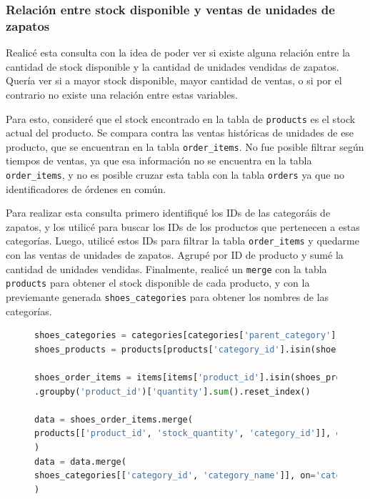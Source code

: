 \subsubsection{Relación entre stock disponible y ventas de unidades de zapatos}

Realicé esta consulta con la idea de poder ver si existe alguna relación entre la cantidad de stock disponible y la cantidad de unidades vendidas de zapatos. Quería ver si a mayor stock disponible, mayor cantidad de ventas, o si por el contrario no existe una relación entre estas variables.

Para esto, consideré que el stock encontrado en la tabla de \texttt{products} es el stock actual del producto. Se compara contra las ventas históricas de unidades de ese producto, que se encuentran en la tabla \texttt{order\_items}. No fue posible filtrar según tiempos de ventas, ya que esa información no se encuentra en la tabla \texttt{order\_items}, y no es posible cruzar esta tabla con la tabla \texttt{orders} ya que no identificadores de órdenes en común.

Para realizar esta consulta primero identifiqué los IDs de las categoráis de zapatos, y los utilicé para buscar los IDs de los productos que pertenecen a estas categorías. Luego, utilicé estos IDs para filtrar la tabla \texttt{order\_items} y quedarme con las ventas de unidades de zapatos. Agrupé por ID de producto y sumé la cantidad de unidades vendidas. Finalmente, realicé un \texttt{merge} con la tabla \texttt{products} para obtener el stock disponible de cada producto, y con la previemante generada \texttt{shoes\_categories} para obtener los nombres de las categorías.

\begin{figure}
\begin{lstlisting}[language=Python, xleftmargin=10pt, xrightmargin=10pt]
shoes_categories = categories[categories['parent_category'] == 'SHOES'][['category_id', 'category_name']]
shoes_products = products[products['category_id'].isin(shoes_categories['category_id'])]

shoes_order_items = items[items['product_id'].isin(shoes_products['product_id'])]
.groupby('product_id')['quantity'].sum().reset_index()

data = shoes_order_items.merge(
products[['product_id', 'stock_quantity', 'category_id']], on='product_id', how='left'
)
data = data.merge(
shoes_categories[['category_id', 'category_name']], on='category_id', how='left'
)
\end{lstlisting}
\end{figure}

